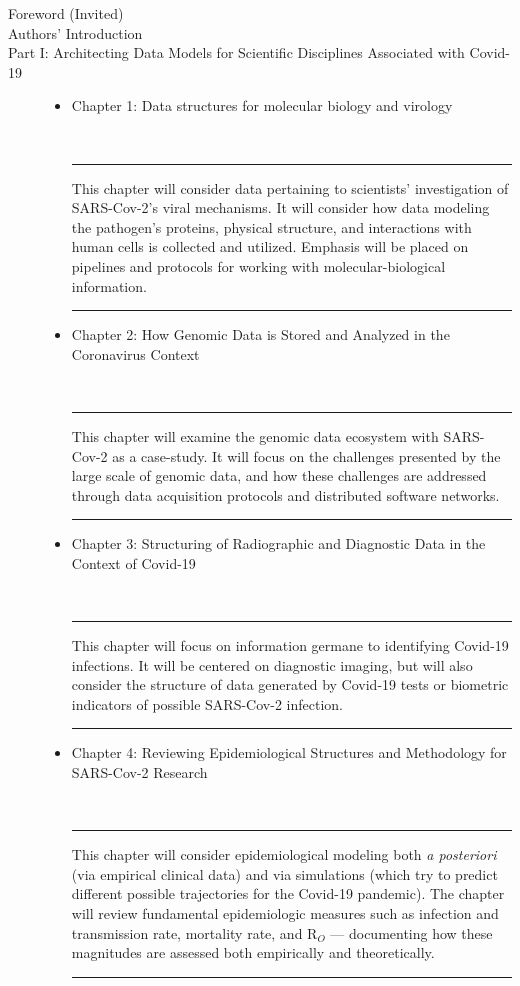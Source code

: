 \documentclass{statsoc}
\newenvironment{summary}{\\\vspace{-4pt}%
%
%
\noindent\hfil\textcolor{rgrey!50!purple}{\rule{0.5\textwidth}{.4pt}}\hfil

\hspace{-2cm}\begin{minipage}{1.02\textwidth}\fontfamily{phv}\fontsize{9}{11}\selectfont}%
{\\\vspace{-1em}\end{minipage}
{\begin{center}\textcolor{rgrey!50!yellow}{\rule{0.5\textwidth}{.4pt}}\end{center}}
\vspace{2em}}%
\begin{document}
{\begin{description}
\item[Foreword (Invited)]

\item[Authors' Introduction]

\item[Part I: Architecting Data Models for Scientific Disciplines Associated with Covid-19]

\begin{itemize}
\item Chapter 1: Data structures for molecular biology and virology

\begin{summary}
This chapter will consider data pertaining to scientists' 
investigation of SARS-Cov-2's viral mechanisms.  It will 
consider how data modeling the pathogen's proteins, 
physical structure, and interactions with human cells 
is collected and utilized.  Emphasis will be placed 
on  pipelines and protocols for 
working with molecular-biological information.   
\end{summary}

\item Chapter 2: How Genomic Data is Stored and Analyzed in the Coronavirus Context

\begin{summary}
This chapter will examine the genomic data ecosystem with SARS-Cov-2 
as a case-study.  It will focus on the challenges presented 
by the large scale of genomic data, and how these challenges 
are addressed through data acquisition protocols and 
distributed software networks. 
\end{summary}

\item Chapter 3: Structuring of Radiographic and Diagnostic Data in the Context of Covid-19

\begin{summary}
This chapter will focus on information germane to identifying Covid-19 infections.  
It will be centered on diagnostic imaging, but will also consider 
the structure of data generated by Covid-19 tests or 
biometric indicators of possible SARS-Cov-2 infection.
\end{summary}

\item Chapter 4: Reviewing Epidemiological Structures and Methodology for SARS-Cov-2 Research

\begin{summary}
This chapter will consider epidemiological modeling both \textit{a posteriori}
(via empirical clinical data) and via simulations (which try to 
predict different possible trajectories for the Covid-19 pandemic).  
The chapter will review fundamental epidemiologic measures such 
as infection and transmission rate, mortality rate, and R$_O$ --- 
documenting how these magnitudes are assessed both empirically and theoretically. 
\end{summary}


\end{itemize}
\end{description}}
\end{document}
